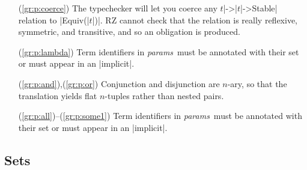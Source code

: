 \documentclass[11pt]{article}
\newcommand{\metav}[1]{\mbox{\textit{#1}}}
\newcommand{\Params}{\metav{params}}
\begin{document}
\begin{enumerate}
	\item[(\ref{gr:p:coerce})] The typechecker will let you coerce any  $t$|->|$t$|->Stable| relation to |Equiv(|$t$|)|.  RZ cannot check that the relation is really reflexive, symmetric, and transitive, and so an obligation is produced.
	\item[(\ref{gr:p:lambda})] Term identifiers in \Params\ must be annotated with their set or must appear in an |implicit|.
	\item[(\ref{gr:p:and}),(\ref{gr:p:or})] Conjunction and disjunction are $n$-ary, so that the translation yields flat $n$-tuples rather than nested pairs.
	\item[(\ref{gr:p:all})--(\ref{gr:p:some1})] Term identifiers in \Params\ must be annotated with their set or must appear in an |implicit|.
\end{enumerate}

\iffalse
& \mid & $\metav{longrelation}\ [\ \Term\ ]^*$\\
   $\metav{longunaryrelation}\ \Term$\\
   $\Term\ \metav{longbinaryrelation}\ \Term$\\	 
\fi

\subsection{Sets}
\end{document}
